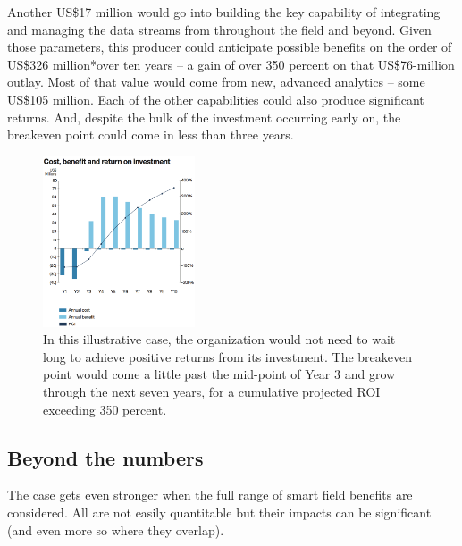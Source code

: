 \documentclass[twocolumn]{article}
\begin{document}
Another US\$17 million would go into building the key capability of integrating and managing the data streams from throughout the field and beyond.
Given those parameters, this producer could anticipate possible benefits on the order of US\$326 million*over ten years –
a gain of over 350 percent on that US\$76-million outlay.
Most of that value would come from new, advanced analytics – some US\$105 million. Each of the other capabilities could
also produce significant returns. And, despite the bulk of the investment occurring early on, the breakeven point could come in less than three years.

\begin{figure}[htb]
      \centering
      \includegraphics[width=0.4\textwidth]{figure03}
      \caption{In this illustrative case, the organization would not
need to wait long to achieve positive returns from its investment. The breakeven point would come a little past the mid-point of Year 3 and grow through the next seven years, for a cumulative projected ROI exceeding 350 percent.}
      \label{fig3}
\end{figure}

\subsection{Beyond the numbers}
The case gets even stronger when the full range of smart field benefits are considered. All are not easily quantitable but their impacts can be significant (and even more so where they overlap).
\end{document}
